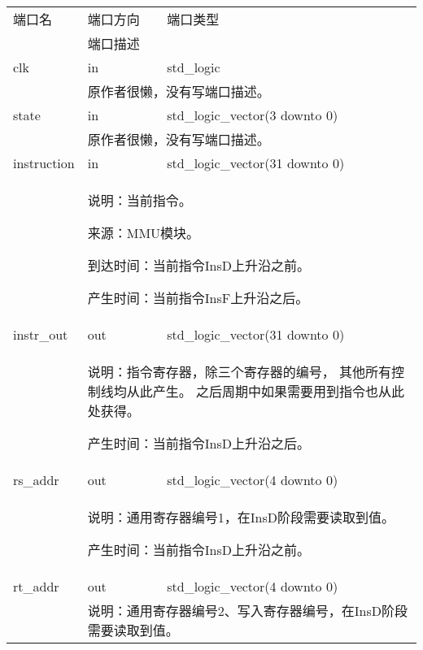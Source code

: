         \begin{tabularx}{\textwidth}{lll}
            \toprule
            端口名          & 端口方向  & 端口类型 \\
            \cmidrule(l){2-3}
            &
            \multicolumn{2}{X}{端口描述} \\
            \midrule
            clk             & in        & std\_logic \\
            \cmidrule(l){2-3}
            &
            \multicolumn{2}{X}{
                原作者很懒，没有写端口描述。
            } \\
            \midrule
            state           & in        & std\_logic\_vector(3 downto 0) \\
            \cmidrule(l){2-3}
            &
            \multicolumn{2}{X}{
                原作者很懒，没有写端口描述。
            } \\
            \midrule
            instruction     & in        & std\_logic\_vector(31 downto 0) \\
            \cmidrule(l){2-3}
            &
            \multicolumn{2}{X}{
                说明：当前指令。

                来源：MMU模块。

                到达时间：当前指令InsD上升沿之前。

                产生时间：当前指令InsF上升沿之后。
            } \\
            \midrule
            instr\_out      & out       & std\_logic\_vector(31 downto 0) \\
            \cmidrule(l){2-3}
            &
            \multicolumn{2}{X}{
                说明：指令寄存器，除三个寄存器的编号，%
                其他所有控制线均从此产生。%
                之后周期中如果需要用到指令也从此处获得。

                产生时间：当前指令InsD上升沿之后。
            } \\
            \midrule
            rs\_addr        & out       & std\_logic\_vector(4 downto 0) \\
            \cmidrule(l){2-3}
            &
            \multicolumn{2}{X}{
                说明：通用寄存器编号1，在InsD阶段需要读取到值。

                产生时间：当前指令InsD上升沿之前。
            } \\
            \midrule
            rt\_addr        & out       & std\_logic\_vector(4 downto 0) \\
            \cmidrule(l){2-3}
            &
            \multicolumn{2}{X}{
                说明：通用寄存器编号2、写入寄存器编号，在InsD阶段需要读取到值。

}
\end{tabularx}
